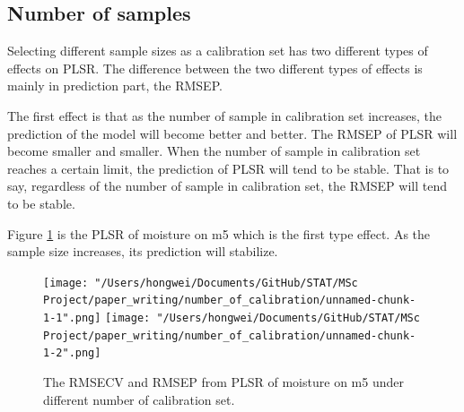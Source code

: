\documentclass[a4paper,12pt,titlepage]{article} %
\numberwithin{equation}{section}  %
\begin{document}
	\subsection{Number of samples}
	\label{sec:Number of Samples}
	
	Selecting different sample sizes as a calibration set has two different types of effects on PLSR. The difference between the two different types of effects is mainly in prediction part, the RMSEP. 
	
	The first effect is that as the number of sample in calibration set increases, the prediction of the model will become better and better. The RMSEP of PLSR will become smaller and smaller. When the number of sample in calibration set reaches a certain limit, the prediction of PLSR will tend to be stable. That is to say, regardless of the number of sample in calibration set, the RMSEP will tend to be stable. 
	
	Figure \ref{fig:samples_1} is the PLSR of moisture on m5 which is the first type effect. As the sample size increases, its prediction will stabilize.
	
				\begin{figure}[h]    %
		\centering           %
		\texttt{[image: "/Users/hongwei/Documents/GitHub/STAT/MSc Project/paper\_writing/number\_of\_calibration/unnamed-chunk-1-1".png]}  %
		\texttt{[image: "/Users/hongwei/Documents/GitHub/STAT/MSc Project/paper\_writing/number\_of\_calibration/unnamed-chunk-1-2".png]}  %
		\caption{The RMSECV and RMSEP from PLSR of moisture on m5 under different number of calibration set.}          %
		\label{fig:samples_1}               %
	\end{figure}                        %
	
\end{document}
